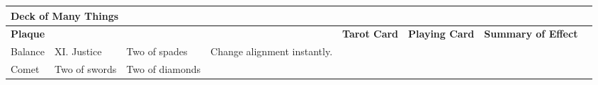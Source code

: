 \vspace{12pt}
\begin{longtable}{llllllll}
\hline
\multicolumn{4}{|p{4.330in}|}{\begin{minipage}[t]{4.330in}\raggedright
\textbf{Deck of Many Things}\end{minipage}}\\
\hline
\multicolumn{4}{p{0.170in}|}{\begin{minipage}[t]{0.170in}\raggedright
\textbf{Plaque}\end{minipage}} & \multicolumn{1}{|p{0.460in}|}{\begin{minipage}[t]{0.460in}\raggedright
\textbf{Tarot Card}\end{minipage}} & \multicolumn{1}{p{0.872in}|}{\begin{minipage}[t]{0.872in}\raggedright
\textbf{Playing Card}\end{minipage}} & \multicolumn{1}{p{1.000in}|}{\begin{minipage}[t]{1.000in}\raggedright
\textbf{Summary of Effect}\end{minipage}}\\
\hline
\multicolumn{1}{p{1.998in}|}{\begin{minipage}[t]{1.998in}\raggedright
Balance\end{minipage}} & \multicolumn{1}{p{0.043in}|}{\begin{minipage}[t]{0.043in}\raggedright
XI. Justice\end{minipage}} & \multicolumn{1}{p{0.043in}|}{\begin{minipage}[t]{0.043in}\raggedright
Two of spades\end{minipage}} & \multicolumn{1}{p{0.043in}|}{\begin{minipage}[t]{0.043in}\raggedright
Change alignment instantly.\end{minipage}}\\
\hline
\multicolumn{1}{p{0.043in}|}{\begin{minipage}[t]{0.043in}\raggedright
Comet\end{minipage}} & \multicolumn{1}{|p{0.460in}|}{\begin{minipage}[t]{0.460in}\raggedright
Two of swords\end{minipage}} & \multicolumn{1}{p{0.872in}|}{\begin{minipage}[t]{0.872in}\raggedright
Two of diamonds\end{minipage}} & \multicolumn{1}{p{1.000in}|}{\begin{minipage}[t]{1.000in}\raggedright

\end{minipage}}
\end{longtable}
